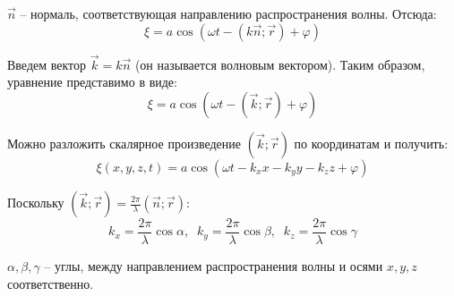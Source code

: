\documentclass{article}
\begin{document}
	$\vec n$ -- нормаль, соответствующая направлению распространения волны. Отсюда:
	\begin{equation}
		\xi = a\cos(\omega t - (k\vec n;\vec r) + \varphi)
	\end{equation}

	Введем вектор $\vec k = k\vec n$ (он называется волновым вектором). Таким образом, уравнение представимо в виде:
	\begin{equation}
		\xi = a\cos(\omega t - (\vec k;\vec r) + \varphi)
	\end{equation}

	Можно разложить скалярное произведение $(\vec k;\vec r)$ по координатам и получить:
	\begin{equation}
		\xi(x,y,z,t) = a\cos(\omega t - k_xx - k_yy - k_zz + \varphi)
	\end{equation}

	Поскольку $(\vec k;\vec r) = \frac{2\pi}{\lambda}(\vec n;\vec r)$:
	\begin{equation}
		k_x = \frac{2\pi}{\lambda}\cos\alpha,\;\;k_y= \frac{2\pi}{\lambda}\cos\beta,\;\;k_z = \frac{2\pi}{\lambda}\cos\gamma
	\end{equation}

	$\alpha, \beta, \gamma$ -- углы, между направлением распространения волны и осями $x, y, z$ соответственно.
\end{document}
